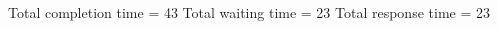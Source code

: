 \begin{RTGrid}[width=0.8\textwidth]{5}{20}
\end{RTGrid}\newline\newline
Total completion time = 43\newline
Total waiting time = 23\newline
Total response time = 23\newline
